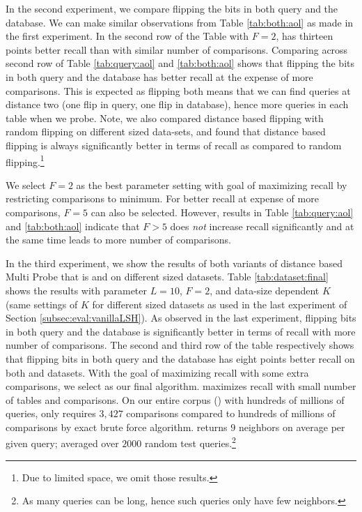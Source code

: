 In the second experiment, we compare flipping the bits in both query and the database. 
We can make similar observations from Table \ref{tab:both:aol} as made in the first experiment. 
In the second row of the Table with $F=2$, \dflipb has thirteen points better recall than \rflipb with similar number of comparisons. 
Comparing across second row of  Table \ref{tab:query:aol} and \ref{tab:both:aol} shows that flipping the bits in both query and the database has better 
recall at the expense of more comparisons. This is expected as flipping both means that we can find queries at distance two (one flip in query, one flip in database), 
hence more queries in each table when we probe. Note, we also compared distance based flipping with random flipping on different sized data-sets, 
and found that distance based flipping is always significantly better in terms of recall as compared to random flipping.\footnote{Due to limited space, we omit those results.} 

We select $F=2$ as the best parameter setting with goal of maximizing recall by restricting comparisons to minimum. For better recall at expense of more comparisons, $F=5$ can also be selected. However, results in Table \ref{tab:query:aol} and \ref{tab:both:aol} indicate that $F>5$ does \emph{not} increase recall significantly and at the same time leads to more number of comparisons.   

In the third experiment, we show the results of both variants of distance based Multi Probe that is \dflipq and \dflipb on different sized datasets. 
Table \ref{tab:dataset:final} shows the results with parameter $L=10$, $F=2$, and data-size dependent $K$ (same settings of $K$ for different sized datasets
as used in the last experiment of Section \ref{subsec:eval:vanillaLSH}).  As observed in the last experiment, flipping bits in both query and the database
is significantly better in terms of recall with more number of comparisons. The second and third row of the table respectively 
shows that flipping bits in both query and the database has eight points better recall on both \dataA and \dataB 
datasets. With the goal of maximizing recall with some extra comparisons, we select \dflipb as our final algorithm. 
\dflipb maximizes recall with small number of tables and comparisons. 
On our entire corpus (\dataC) with hundreds of millions of queries, 
\dflipb only requires $3,427$ comparisons compared to hundreds of millions of comparisons by exact brute force algorithm.  
\dflipb returns $9$ neighbors on average per given query; averaged over $2000$ random test 
queries.\footnote{As many queries can be long, hence such queries only have few neighbors.} 


